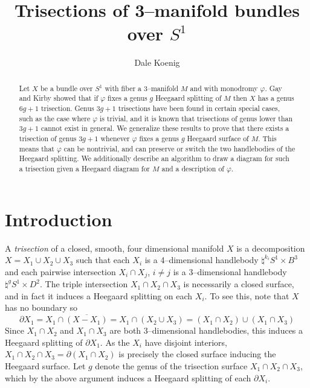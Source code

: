 \documentclass[12pt]{amsart}
\newcommand{\del}{\partial }
\theoremstyle{definition}
\theoremstyle{remark}
\begin{document}
\title{Trisections of 3--manifold bundles over $S^1$}
\author{Dale Koenig}
\date{}


\begin{abstract}
Let $X$ be a bundle over $S^1$ with fiber a 3--manifold $M$ and with monodromy $\varphi$.  Gay and Kirby showed that if $\varphi$ fixes a genus $g$ Heegaard splitting of $M$ then $X$ has a genus $6g+1$ trisection.  Genus $3g+1$ trisections have been found in certain special cases, such as the case where $\varphi$ is trivial, and it is known that trisections of genus lower than $3g+1$ cannot exist in general.  We generalize these results to prove that there exists a trisection of genus $3g+1$ whenever $\varphi$ fixes a genus $g$ Heegaard surface of $M$.  This means that $\varphi$ can be nontrivial, and can preserve or switch the two handlebodies of the Heegaard splitting.  We additionally describe an algorithm to draw a diagram for such a trisection given a Heegaard diagram for $M$ and a description of $\varphi$.
\end{abstract}

\maketitle

\section{Introduction}
A \emph{trisection} of a closed, smooth, four dimensional manifold $X$ is a decomposition $X = X_1 \cup X_2 \cup X_3$ such that each $X_i$ is a 4--dimensional handlebody $\natural^{k_i} S^1 \times B^3$ and each pairwise intersection $X_i \cap X_j$, $i \not = j$ is a 3--dimensional handlebody $\natural^g S^1 \times D^2$.  The triple intersection $X_1 \cap X_2 \cap X_3$ is necessarily a closed surface, and in fact it induces a Heegaard splitting on each $X_i$.  To see this, note that $X$ has no boundary so $$\del X_1 = X_1 \cap \overline{(X - X_1)} = X_1 \cap (X_2 \cup X_3) = (X_1 \cap X_2) \cup (X_1 \cap X_3)$$  Since $X_1 \cap X_2$ and $X_1 \cap X_3$ are both 3--dimensional handlebodies, this induces a Heegaard splitting of $\del X_1$.  As the $X_i$ have disjoint interiors, $X_1 \cap X_2 \cap X_3 = \del(X_1 \cap X_2)$ is precisely the closed surface inducing the Heegaard surface.  Let $g$ denote the genus of the trisection surface $X_1 \cap X_2 \cap X_3$, which by the above argument induces a Heegaard splitting of each $\del X_i$.  
\end{document}
